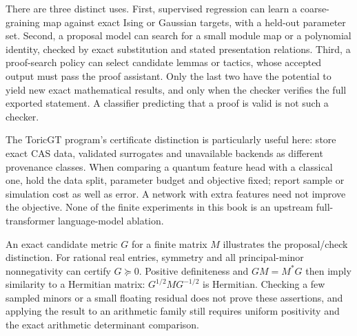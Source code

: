 \begin{center}
\end{center}

There are three distinct uses. First, supervised regression can learn a
coarse-graining map against exact Ising or Gaussian targets, with a held-out
parameter set. Second, a proposal model can search for a small module map
or a polynomial identity, checked by exact substitution and stated
presentation relations. Third, a proof-search policy can select candidate
lemmas or tactics, whose accepted output must pass the proof assistant.
Only the last two have the potential to yield new exact mathematical
results, and only when the checker verifies the full exported statement.
A classifier predicting that a proof is valid is not such a checker.

The ToricGT program's certificate distinction is particularly useful here:
store exact CAS data, validated surrogates and unavailable backends as
different provenance classes. When comparing a quantum feature head with
a classical one, hold the data split, parameter budget and objective fixed;
report sample or simulation cost as well as error. A network with extra
features need not improve the objective. None of the finite experiments
in this book is an upstream full-transformer language-model ablation.

An exact candidate metric $G$ for a finite matrix $M$ illustrates the
proposal/check distinction. For rational real entries, symmetry and all
principal-minor nonnegativity can certify $G\succeq0$. Positive
definiteness and $GM=M^*G$ then imply similarity to a Hermitian matrix:
$G^{1/2}MG^{-1/2}$ is Hermitian. Checking a few sampled minors or a small
floating residual does not prove these assertions, and applying the result
to an arithmetic family still requires uniform positivity and the exact
arithmetic determinant comparison.


